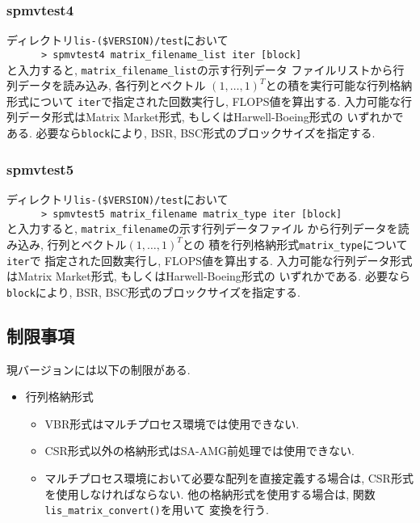 \documentclass[a4paper]{jarticle}
\begin{document}
{{\subsubsection{spmvtest4}
ディレクトリ{\tt lis-(\$VERSION)/test}において\\
 \verb+      > spmvtest4 matrix_filename_list iter [block]+\\
と入力すると, {\tt matrix\_filename\_list}の示す行列データ
ファイルリストから行列データを読み込み, 各行列とベクトル
$(1,\dots,1)^T$との積を実行可能な行列格納形式について
{\tt iter}で指定された回数実行し, FLOPS値を算出する.
入力可能な行列データ形式はMatrix Market形式, もしくはHarwell-Boeing形式の
いずれかである. 
必要なら{\tt block}により, BSR, BSC形式のブロックサイズを指定する. 

\subsubsection{spmvtest5}
ディレクトリ{\tt lis-(\$VERSION)/test}において\\
 \verb+      > spmvtest5 matrix_filename matrix_type iter [block]+\\
と入力すると, {\tt matrix\_filename}の示す行列データファイル
から行列データを読み込み, 行列とベクトル$(1,\dots,1)^T$との
積を行列格納形式{\tt matrix\_type}について{\tt iter}で
指定された回数実行し, FLOPS値を算出する. 
入力可能な行列データ形式はMatrix Market形式, もしくはHarwell-Boeing形式の
いずれかである. 
必要なら{\tt block}により, BSR, BSC形式のブロックサイズを指定する. 

\subsection{制限事項}
現バージョンには以下の制限がある. 
\begin{itemize}
\item 行列格納形式
\begin{itemize}
\item VBR形式はマルチプロセス環境では使用できない. 
\item CSR形式以外の格納形式はSA-AMG前処理では使用できない. 
\item マルチプロセス環境において必要な配列を直接定義する場合は, CSR形式
      を使用しなければならない.
      他の格納形式を使用する場合は, 関数\verb|lis_matrix_convert()|を用いて
      変換を行う. 
\end{itemize}


\end{itemize}}}
\end{document}
